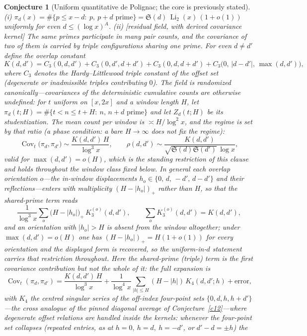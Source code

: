 \documentclass[11pt]{article}
\newtheorem{conjecture}{Conjecture}
\theoremstyle{definition}
\newcommand{\Li}{\operatorname{Li}}
\newcommand{\SG}{\mathfrak S}
\newcommand{\CT}{C_3}
\begin{document}
\setcounter{conjecture}{7}%
\begin{conjecture}[Uniform quantitative de Polignac; the core is
previously stated]\label{c16}
\emph{(i)} $\pi_d(x)=\#\{p\le x-d:\ p,\ p+d \text{ prime}\}
=\SG(d)\,\Li_2(x)\,(1+o(1))$ uniformly for even $d\le(\log x)^{A}$.
\emph{(ii)} [residual field, with derived covariance kernel]  The
same primes participate in many pair counts, and the covariance of
two of them is carried by triple configurations sharing one prime.
For even $d\neq d'$ define the overlap constant
\[
K(d,d')=\CT(0,d,d')+\CT(0,d',d+d')+\CT(0,d,d+d')
+\CT\bigl(0,\,|d-d'|,\,\max(d,d')\bigr),
\]
where $\CT$ denotes the Hardy--Littlewood triple constant of the
offset set (degenerate or inadmissible triples contributing $0$).
The field is randomized canonically---covariances of the
deterministic cumulative counts are otherwise undefined: for $t$ uniform on
$[x,2x]$ and a window length $H$, let
$\pi_d(t;H)=\#\{t<n\le t+H:\ n,\,n+d \text{ prime}\}$ and let
$Z_d(t;H)$ be its studentization.  The mean count per window is
$\asymp H/\log^2x$, and the regime is set by that ratio (a phase
condition: a bare $H\to\infty$ does not fix the regime):
\[
\operatorname{Cov}_t\bigl(\pi_d,\pi_{d'}\bigr)
\sim\frac{K(d,d')\,H}{\log^3x},
\qquad
\rho(d,d')\sim\frac{K(d,d')}{\sqrt{\SG(d)\SG(d')}\,\log x},
\]
valid for $\max(d,d')=o(H)$, which is the standing restriction of
this clause and holds throughout the window class fixed below.  In
general each overlap orientation $o$---the in-window displacements
$h_o\in\{0,\,d,\,-d',\,d-d'\}$ and their reflections---enters with
multiplicity $(H-|h_o|)_+$ rather than $H$, so that the shared-prime
term reads
\[
\frac1{\log^3x}\sum_{o}\bigl(H-|h_o|\bigr)_+\,K_3^{(o)}(d,d'),
\qquad \sum_o K_3^{(o)}(d,d')=K(d,d'),
\]
and an orientation with $|h_o|>H$ is absent from the window
altogether; under $\max(d,d')=o(H)$ one has $(H-|h_o|)_+=H(1+o(1))$
for every orientation and the displayed form is recovered, so the
uniform-in-$d$ statement carries that restriction throughout.
Here the shared-prime (triple) term is the \emph{first} covariance
contribution but not the whole of it: the full expansion is
\[
\operatorname{Cov}_t(\pi_d,\pi_{d'})
=\frac{K(d,d')\,H}{\log^3x}
+\frac1{\log^4x}\sum_{|h|\le H}(H-|h|)\,K_4(d,d';h)
+\text{error},
\]
with $K_4$ the centred singular series of the off-index four-point
sets $\{0,d,h,h+d'\}$---the cross analogue of the pinned diagonal
average of Conjecture~\ref{c12}---where degenerate offset relations
are handled inside the kernels: whenever the four-point set
collapses (repeated
entries, as at $h=0,\ h=d,\ h=-d'$, or $d'-d=\pm h$) the

\end{conjecture}
\end{document}
